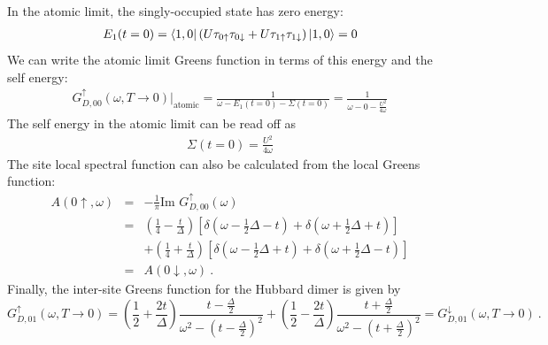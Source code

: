 \documentclass{article}
\numberwithin{equation}{section}
\begin{document}
In the atomic limit, the singly-occupied state has zero energy:
\begin{equation}\begin{aligned}
	E_1(t=0) = \bra{1,0}\left(U \tau_{0 \uparrow}\tau_{0 \downarrow} + U \tau_{1 \uparrow}\tau_{1 \downarrow}\right) \ket{1,0} = 0
\end{aligned}\end{equation}
We can write the atomic limit Greens function in terms of this energy and the self energy:
\begin{equation}\begin{aligned}
	G_{D,00}^\uparrow(\omega, T \to 0) \bigg\vert_\text{atomic} = \frac{1}{\omega - E_1(t=0) - \Sigma(t=0)} = \frac{1}{\omega - 0 -\frac{U^2}{4\omega}}
\end{aligned}\end{equation}
The self energy in the atomic limit can be read off as 
\begin{equation}\begin{aligned}
	\label{dimer_selfenergy}
\Sigma(t=0) = \frac{U^2}{4\omega}
\end{aligned}\end{equation}
The site local spectral function can also be calculated from the local Greens function:
\begin{eqnarray}
A(0\uparrow, \omega) &=& - \frac{1}{\pi}\text{Im }G_{D,00}^\uparrow(\omega)\nonumber\\
			     &=& \left( \frac{1}{4} - \frac{t}{\Delta} \right)\left[\delta(\omega - \frac{1}{2}\Delta - t) + \delta(\omega + \frac{1}{2}\Delta + t)\right]\nonumber\\ 
			     &&+ \left( \frac{1}{4} + \frac{t}{\Delta} \right) \left[\delta(\omega - \frac{1}{2}\Delta + t) + \delta(\omega + \frac{1}{2}\Delta - t)\right]\\ 
			     &=& A(0\downarrow, \omega)~.\nonumber
\end{eqnarray}
Finally, the inter-site Greens function for the Hubbard dimer is given by
\begin{equation}
\label{dimer_intersite_G}
G_{D,01}^\uparrow(\omega, T \to 0) = \left( \frac{1}{2} + \frac{2t}{\Delta} \right) \frac{t - \frac{\Delta}{2}}{\omega^2 - \left(t - \frac{\Delta}{2}\right)^2} + \left( \frac{1}{2} - \frac{2t}{\Delta} \right) \frac{t + \frac{\Delta}{2}}{\omega^2 - \left(t + \frac{\Delta}{2}\right)^2} = G_{D,01}^\downarrow(\omega, T \to 0)~.
\end{equation}
\end{document}

